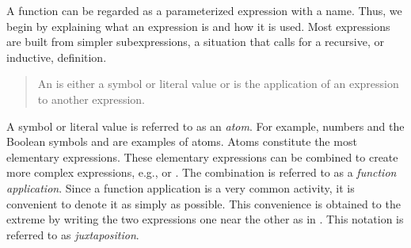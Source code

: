 A function can be regarded as a parameterized expression with a name.
Thus, we begin by explaining what an expression is and
how it is used.
Most expressions are built from simpler subexpressions,
a situation that calls for a recursive, or inductive, definition.
%
\begin{quote}
An 
is either a symbol or literal value or
is the application of an expression to another expression.
\end{quote}
%
A symbol or literal value is referred to as an \emph{atom}.
For example, numbers and the Boolean symbols 
and  are examples of atoms.
Atoms constitute the most elementary expressions.
These elementary expressions can be combined to create
more complex expressions, e.g.,  or
.
The combination is referred to as a
\emph{function application}.
Since a function application is a very common activity,
it is convenient to denote it as simply as possible.
This convenience is obtained to the extreme by writing the two expressions one
near the other as in .
This notation is referred to as \emph{juxtaposition}.

